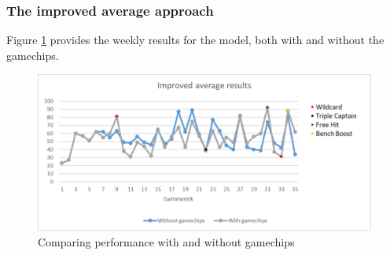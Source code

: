 \subsubsection{The improved average approach} \label{Improved_avg_results}
Figure \ref{With_Without_Chips} provides the weekly results for the model, both with and without the gamechips. 

\begin{figure}[H]
    \centering
    \includegraphics[scale=0.80]{fig/chapter_7/Gamechips_vs_without_colour.png}
    \caption{Comparing performance with and without gamechips}
\label{With_Without_Chips}    
\end{figure}


